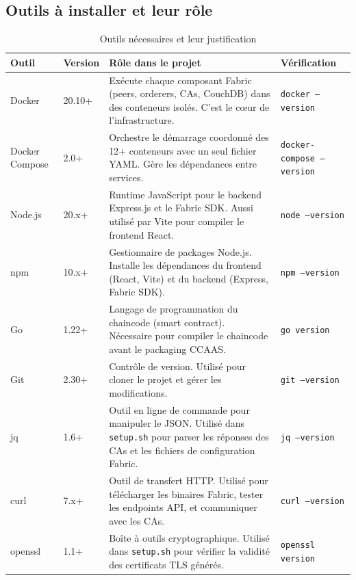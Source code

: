 \documentclass[12pt,a4paper,twoside]{report}
\begin{document}
\subsection{Outils à installer et leur rôle}

\begin{table}[H]
\centering
\begin{tabularx}{\textwidth}{llXl}
\toprule
\textbf{Outil} & \textbf{Version} & \textbf{Rôle dans le projet} & \textbf{Vérification} \\
\midrule
Docker & 20.10+ & Exécute chaque composant Fabric (peers, orderers, CAs, CouchDB) dans des conteneurs isolés. C'est le cœur de l'infrastructure. & \texttt{docker --version} \\
Docker Compose & 2.0+ & Orchestre le démarrage coordonné des 12+ conteneurs avec un seul fichier YAML. Gère les dépendances entre services. & \texttt{docker-compose --version} \\
Node.js & 20.x+ & Runtime JavaScript pour le backend Express.js et le Fabric SDK. Aussi utilisé par Vite pour compiler le frontend React. & \texttt{node --version} \\
npm & 10.x+ & Gestionnaire de packages Node.js. Installe les dépendances du frontend (React, Vite) et du backend (Express, Fabric SDK). & \texttt{npm --version} \\
Go & 1.22+ & Langage de programmation du chaincode (smart contract). Nécessaire pour compiler le chaincode avant le packaging CCAAS. & \texttt{go version} \\
Git & 2.30+ & Contrôle de version. Utilisé pour cloner le projet et gérer les modifications. & \texttt{git --version} \\
jq & 1.6+ & Outil en ligne de commande pour manipuler le JSON. Utilisé dans \texttt{setup.sh} pour parser les réponses des CAs et les fichiers de configuration Fabric. & \texttt{jq --version} \\
curl & 7.x+ & Outil de transfert HTTP. Utilisé pour télécharger les binaires Fabric, tester les endpoints API, et communiquer avec les CAs. & \texttt{curl --version} \\
openssl & 1.1+ & Boîte à outils cryptographique. Utilisé dans \texttt{setup.sh} pour vérifier la validité des certificats TLS générés. & \texttt{openssl version} \\
\bottomrule
\end{tabularx}
\caption{Outils nécessaires et leur justification}
\end{table}
\end{document}
